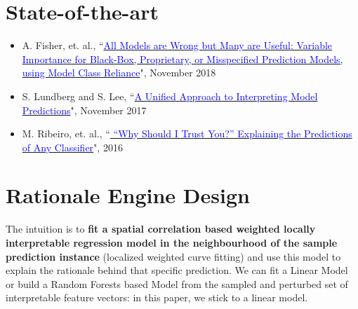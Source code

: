 \documentclass{article}
\begin{document}
\section{State-of-the-art}
\begin{itemize}
    \item A. Fisher, et. al., ``\href{https://arxiv.org/pdf/1801.01489.pdf}{\textcolor{blue}{All Models are Wrong but Many are Useful: Variable Importance for Black-Box, Proprietary, or Misspecified Prediction Models, using Model Class Reliance}}", November 2018
    \item S. Lundberg and S. Lee, ``\href{https://arxiv.org/pdf/1705.07874.pdf}{\textcolor{blue}{A Unified Approach to Interpreting Model Predictions}}", November 2017
    \item M. Ribeiro, et. al., ``\href{https://www.kdd.org/kdd2016/papers/files/rfp0573-ribeiroA.pdf}{\textcolor{blue}{ “Why Should I Trust You?” Explaining the Predictions of Any Classifier}}", 2016
\end{itemize}
\section{Rationale Engine Design}
The intuition is to \textbf{fit a spatial correlation based weighted locally interpretable regression model in the neighbourhood of the sample prediction instance} (localized weighted curve fitting) and use this model to explain the rationale behind that specific prediction. We can fit a Linear Model or build a Random Forests based Model from the sampled and perturbed set of interpretable feature vectors: in this paper, we stick to a linear model.
\end{document}
